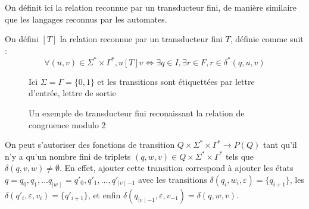\documentclass{scrartcl}
\begin{document}
\begin{flushleft}
On définit ici la relation reconnue par un transducteur fini, de manière similaire que les
langages reconnus par les automates.
\begin{define}
    On défini $[T]$ la relation reconnue par un transducteur fini $T$, définie comme suit :
    \[ \forall (u, v) \in \Sigma^* \times \Gamma^*, u[T]v \Leftrightarrow \exists q \in I, \exists r \in F,
    r \in \delta^*(q, u, v) \]
\end{define}

\begin{figure}[h]
    \caption{Un exemple de transducteur fini reconaissant la relation de congruence modulo 2}
    \begin{center}
    Ici $\Sigma = \Gamma = \{0, 1\}$ et les transitions sont étiquettées par lettre d'entrée, lettre de sortie\\
    \vspace*{0.5cm}
    \end{center}
\end{figure}

\begin{prop}[Généralisation]
    On peut s'autoriser des fonctions de transition $Q \times \Sigma^* \times \Gamma^* \longrightarrow P(Q)$ tant qu'il n'y a qu'un nombre fini de triplets $(q, w, v) \in Q \times \Sigma^* \times \Gamma^*$ tels que $\delta(q, v, w) \neq \emptyset$. En effet,
ajouter cette transition correspond à ajouter les états $q=q_0, q_1, \dots q_{\mid w \mid} = q'_0, q'_1, \dots, q'_{\mid v \mid-1}$
avec les transitions $\delta(q_i, w_i, \varepsilon )= \{q_{i+1}\}$, les $\delta(q'_i, \varepsilon, v_i) =\{q'_{i+1}\}$, et enfin
$\delta(q_{\mid v \mid -1}, \varepsilon, v_{-1}) = \delta(q, w, v)$.
\end{prop}


\end{flushleft}
\end{document}
